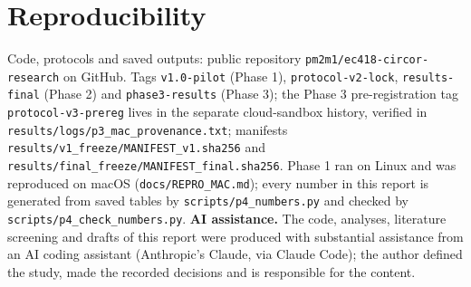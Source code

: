 \documentclass[conference]{IEEEtran}
\begin{document}
\section*{Reproducibility}
Code, protocols and saved outputs: public repository \texttt{pm2m1/ec418-circor-research} on GitHub. Tags \texttt{v1.0-pilot}
(Phase 1), \texttt{protocol-v2-lock}, \texttt{results-final} (Phase 2) and \texttt{phase3-results} (Phase 3); the
Phase 3 pre-registration tag \texttt{protocol-v3-prereg} lives in the separate cloud-sandbox history, verified in
\texttt{results/logs/p3\_mac\_provenance.txt}; manifests \texttt{results/v1\_freeze/MANIFEST\_v1.sha256} and
\texttt{results/final\_freeze/MANIFEST\_final.sha256}. Phase 1 ran on Linux and was reproduced on macOS
(\texttt{docs/REPRO\_MAC.md}); every number in this report is generated from saved tables by \texttt{scripts/p4\_numbers.py}
and checked by \texttt{scripts/p4\_check\_numbers.py}.
\textbf{AI assistance.} The code, analyses, literature screening and drafts of this report were produced with substantial
assistance from an AI coding assistant (Anthropic's Claude, via Claude Code); the author defined the study, made the
recorded decisions and is responsible for the content.
\end{document}
